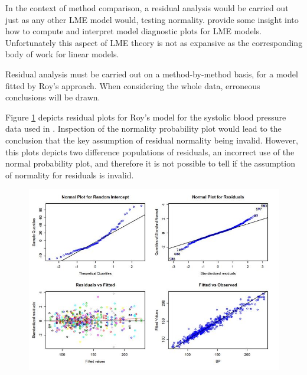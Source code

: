 \documentclass[12pt, a4paper]{report}
\theoremstyle{definition}
\theoremstyle{remark}
\begin{document}
In the context of method comparison, a residual analysis would be carried out just as any other LME model would, testing normality. \citet{PB} provide some insight into how to compute and interpret model diagnostic plots for LME models. Unfortunately this aspect of LME theory is not as expansive as the corresponding body of work for linear models.
 
 Residual analysis must be carried out on a method-by-method basis, for a model fitted by Roy's approach. When considering the whole data, erroneous conclusions will be drawn.

Figure \ref{fig:ResidPlot} depicts residual plots for Roy's model for the systolic blood pressure data used in \citet{BA99}. Inspection of the normality probability plot would lead to the conclusion that the key assumption of residual normality being invalid. However, this plots depicts two difference populations of residuals, an incorrect use of the normal probability plot, and therefore it is not possible to tell if the assumption of normality for residuals is invalid.

\begin{figure}[h!]
	\centering
	\includegraphics[width=0.9\linewidth]{images/ResidPlot}
	\caption{}
	\label{fig:ResidPlot}
\end{figure}



\end{document}
